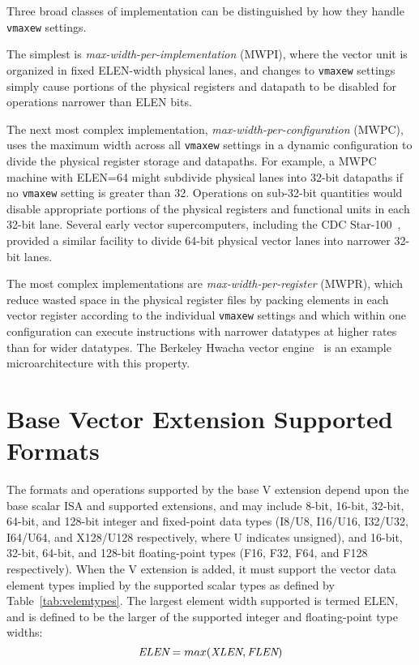 \begin{commentary}
Three broad classes of implementation can be distinguished by how they
handle {\tt vmaxew} settings.

The simplest is {\em max-width-per-implementation} (MWPI), where the
vector unit is organized in fixed ELEN-width physical lanes, and
changes to {\tt vmaxew} settings simply cause portions of the
physical registers and datapath to be disabled for operations narrower
than ELEN bits.

The next most complex implementation, {\em
  max-width-per-configuration} (MWPC), uses the maximum width across
all {\tt vmaxew} settings in a dynamic configuration to divide the
physical register storage and datapaths.  For example, a MWPC machine
with ELEN=64 might subdivide physical lanes into 32-bit datapaths if
no {\tt vmaxew} setting is greater than 32.  Operations on
sub-32-bit quantities would disable appropriate portions of the
physical registers and functional units in each 32-bit lane.  Several
early vector supercomputers, including the CDC
Star-100~\cite{cdcstart100}, provided a similar facility to divide
64-bit physical vector lanes into narrower 32-bit lanes.

The most complex implementations are {\em max-width-per-register}
(MWPR), which reduce wasted space in the physical register files by
packing elements in each vector register according to the individual
{\tt vmaxew} settings and which within one configuration can
execute instructions with narrower datatypes at higher rates than for
wider datatypes.  The Berkeley Hwacha vector
engine~\cite{hwachatr,mixedprecision} is an example microarchitecture
with this property.
\end{commentary}

\clearpage

\section{Base Vector Extension Supported Formats}

The formats and operations supported by the base V extension depend
upon the base scalar ISA and supported extensions, and may include
8-bit, 16-bit, 32-bit, 64-bit, and 128-bit integer and fixed-point
data types (I8/U8, I16/U16, I32/U32, I64/U64, and X128/U128
respectively, where U indicates unsigned), and 16-bit, 32-bit, 64-bit,
and 128-bit floating-point types (F16, F32, F64, and F128
respectively).  When the V extension is added, it must support the
vector data element types implied by the supported scalar types as
defined by Table~\ref{tab:velemtypes}.  The largest element width
supported is termed ELEN, and is defined to be the larger of the
supported integer and floating-point type widths:
\[ \mbox{\em ELEN} = max(\mbox{\em XLEN}, \mbox{\em FLEN}) \]

